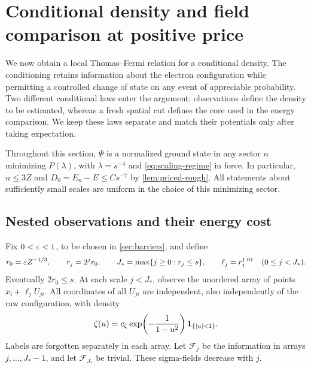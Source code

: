\section{Conditional density and field comparison at positive price}
\label{sec:comparison}

We now obtain a local Thomas--Fermi relation for a conditional density.
The conditioning retains information about the electron configuration while
permitting a controlled change of state on any event of appreciable probability.
Two different conditional laws enter the argument: observations define the
density to be estimated, whereas a fresh spatial cut defines the core used in
the energy comparison.  We keep these laws separate and match their potentials
only after taking expectation.

Throughout this section, $\Psi$ is a normalized ground state in any sector $n$
minimizing $P(\lambda)$, with $\lambda=s^{-4}$ and
\cref{eq:scaling-regime} in force.  In particular,
$n\leq 3Z$ and $D_0=E_n-E\leq Cs^{-7}$ by
\cref{lem:priced-rough}.  All statements about sufficiently small scales are
uniform in the choice of this minimizing sector.

\subsection{Nested observations and their energy cost}

Fix $0<\varepsilon<1$, to be chosen in \cref{sec:barriers}, and define
\begin{equation}
 r_0=\varepsilon Z^{-1/3},\qquad r_j=2^j r_0,\qquad
 J_* =\max\{j\geq0:r_j\leq s\},\qquad
 \ell_j=r_j^{1.01}\quad(0\leq j<J_*).
 \label{eq:observation-scales}
\end{equation}
Eventually $2r_0\leq s$.  At each scale $j<J_*$, observe the unordered array
of points $x_i+\ell_jU_{ji}$.  All coordinates of all $U_{ji}$ are independent,
also independently of the raw configuration, with density
\[
 \zeta(u)=c_\zeta\exp\!\left(-\frac1{1-u^2}\right)
                  \mathbf 1_{\{|u|<1\}}.
\]
Labels are forgotten separately in each array.  Let $\mathcal F_j$ be the
information in arrays $j,\ldots,J_*-1$, and let $\mathcal F_{J_*}$ be trivial.
These sigma-fields decrease with $j$.

